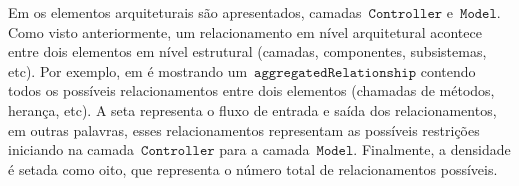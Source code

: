 
Em  os elementos arquiteturais são apresentados, camadas~$\mathtt{Controller}$ e~$\mathtt{Model}$. Como visto anteriormente, um relacionamento em nível arquitetural acontece entre dois elementos em nível estrutural (camadas, componentes, subsistemas, etc). Por exemplo, em  é mostrando um~$\mathtt{aggregatedRelationship}$ contendo todos os possíveis relacionamentos  entre dois elementos (chamadas de métodos, herança, etc). A seta  representa o fluxo de entrada e saída dos relacionamentos, em outras palavras, esses relacionamentos representam as possíveis restrições iniciando na camada~$\mathtt{Controller}$  para a camada~$\mathtt{Model}$. Finalmente, a densidade  é setada como oito, que representa o número total de relacionamentos possíveis.

